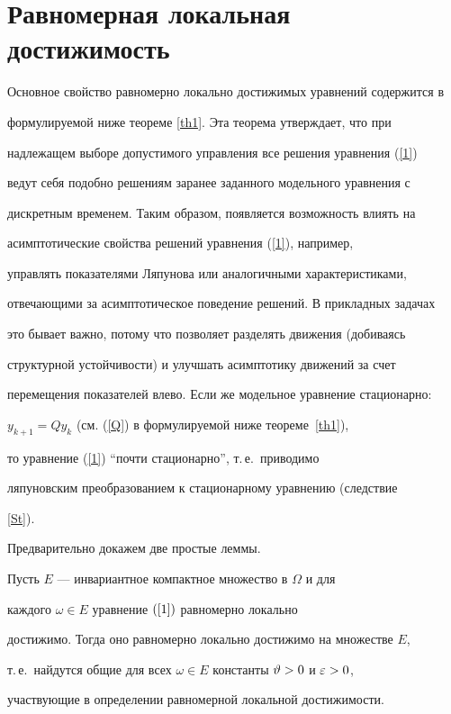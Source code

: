 \section{Равномерная локальная достижимость}





Основное свойство равномерно локально достижимых уравнений содержится в


формулируемой ниже теореме \ref{th1}. Эта теорема утверждает, что при


надлежащем выборе допустимого управления все решения уравнения (\ref{1})


ведут себя подобно решениям заранее заданного модельного уравнения с


дискретным временем. Таким образом, появляется возможность влиять на


асимптотические свойства решений уравнения (\ref{1}), например,


управлять показателями Ляпунова или аналогичными характеристиками,


отвечающими за асимптотическое поведение решений. В прикладных задачах


это бывает важно, потому что позволяет разделять движения (добиваясь


структурной устойчивости) и улучшать асимптотику движений за счет


перемещения показателей влево. Если же модельное уравнение стационарно:


$y_{k+1}=Qy_k$ (см. (\ref{Q}) в формулируемой ниже теореме~\ref{th1}),


то уравнение (\ref{1}) ``почти стационарно'', т.\,е.~приводимо


ляпуновским преобразованием к стационарному уравнению (следствие


\ref{St}).





Предварительно докажем две простые леммы.





\begin{lem}


\label{lm3}


Пусть $E$ --- инвариантное компактное множество в $\Omega$ и для


каждого $\omega\in E$  уравнение $(\ref{1})$ равномерно локально


достижимо. Тогда оно равномерно локально достижимо на множестве $E$,


т.\,е.~найдутся общие для всех $\omega\in E$ константы $\vartheta>0$ и $\varepsilon>0$,


участвующие в определении равномерной локальной достижимости.


\end{lem}






